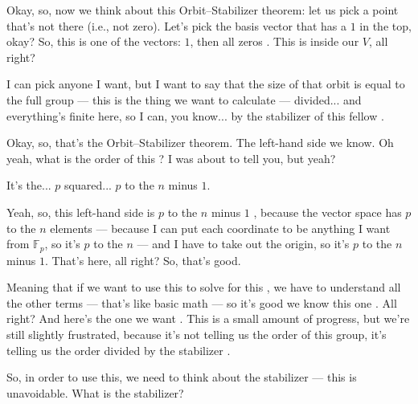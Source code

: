 \begin{speech}[01:13:33 - 01:14:31]
Okay, so, now we think about this Orbit--Stabilizer theorem: let us pick a point that's not there (i.e., not zero). Let's pick the basis vector that has a $1$ in the top, okay? So, this is one of the vectors: $1$, then all zeros . This is inside our $V$, all right?

I can pick anyone I want, but I want to say that the size of that orbit is equal to the full group --- this is the thing we want to calculate --- divided... and everything's finite here, so I can, you know... by the stabilizer of this fellow .

Okay, so, that's the Orbit--Stabilizer theorem. The left-hand side we know. Oh yeah, what is the order of this ? I was about to tell you, but yeah?
\end{speech}

\begin{student}
It's the... $p$ squared... $p$ to the $n$ minus $1$.
\end{student}

\begin{speech}[01:14:35 - 01:15:22]
Yeah, so, this left-hand side is $p$ to the $n$ minus $1$ , because the vector space has $p$ to the $n$ elements --- because I can put each coordinate to be anything I want from $\mathbb{F}_p$, so it's $p$ to the $n$ --- and I have to take out the origin, so it's $p$ to the $n$ minus $1$. That's here, all right? So, that's good.

Meaning that if we want to use this to solve for this , we have to understand all the other terms --- that's like basic math --- so it's good we know this one . All right? And here's the one we want . This is a small amount of progress, but we're still slightly frustrated, because it's not telling us the order of this group, it's telling us the order divided by the stabilizer .

So, in order to use this, we need to think about the stabilizer --- this is unavoidable. What is the stabilizer?
\end{speech}

